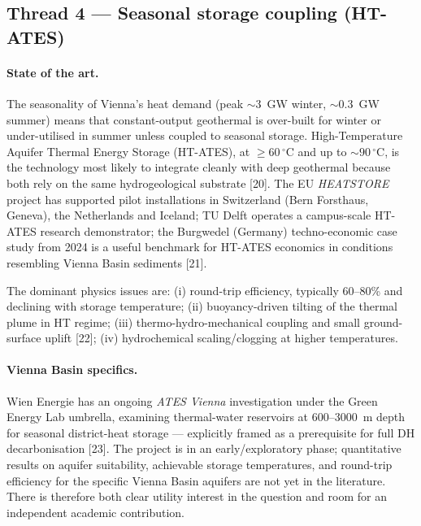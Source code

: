\documentclass{article}
\begin{document}
\subsection*{Thread 4 --- Seasonal storage coupling (HT-ATES)}

\paragraph{State of the art.}
The seasonality of Vienna's heat demand (peak $\sim 3$~GW winter, $\sim 0.3$~GW
summer) means that constant-output geothermal is over-built for winter or
under-utilised in summer unless coupled to seasonal storage.
High-Temperature Aquifer Thermal Energy Storage (HT-ATES), at
$\geq 60\,^\circ$C and up to $\sim 90\,^\circ$C, is the technology most
likely to integrate cleanly with deep geothermal because both rely on
the same hydrogeological substrate [20]. The EU
\emph{HEATSTORE} project has supported pilot installations in
Switzerland (Bern Forsthaus, Geneva), the Netherlands and Iceland;
TU Delft operates a campus-scale HT-ATES research demonstrator;
the Burgwedel (Germany) techno-economic case study from 2024 is a
useful benchmark for HT-ATES economics in conditions resembling
Vienna Basin sediments [21].

The dominant physics issues are: (i) round-trip efficiency, typically
60--80\% and declining with storage temperature; (ii) buoyancy-driven
tilting of the thermal plume in HT regime; (iii) thermo-hydro-mechanical
coupling and small ground-surface uplift [22];
(iv) hydrochemical scaling/clogging at higher temperatures.

\paragraph{Vienna Basin specifics.}
Wien Energie has an ongoing \emph{ATES Vienna} investigation under the
Green Energy Lab umbrella, examining thermal-water reservoirs at
600--3000~m depth for seasonal district-heat storage --- explicitly
framed as a prerequisite for full DH decarbonisation [23].
The project is in an early/exploratory phase; quantitative results
on aquifer suitability, achievable storage temperatures, and
round-trip efficiency for the specific Vienna Basin aquifers are not
yet in the literature. There is therefore both clear utility interest
in the question and room for an independent academic contribution.
\end{document}
